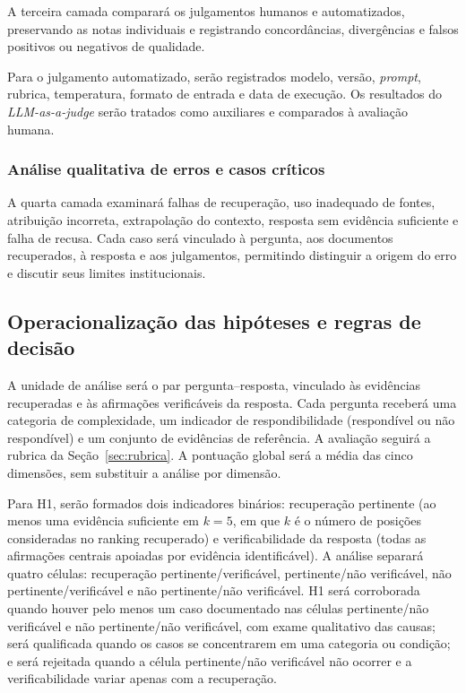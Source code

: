 A terceira camada comparará os julgamentos humanos e automatizados, preservando as notas individuais e registrando concordâncias, divergências e falsos positivos ou negativos de qualidade.

Para o julgamento automatizado, serão registrados modelo, versão, \textit{prompt}, rubrica, temperatura, formato de entrada e data de execução. Os resultados do \textit{LLM-as-a-judge} serão tratados como auxiliares e comparados à avaliação humana.

\subsubsection{Análise qualitativa de erros e casos críticos}

A quarta camada examinará falhas de recuperação, uso inadequado de fontes, atribuição incorreta, extrapolação do contexto, resposta sem evidência suficiente e falha de recusa. Cada caso será vinculado à pergunta, aos documentos recuperados, à resposta e aos julgamentos, permitindo distinguir a origem do erro e discutir seus limites institucionais.

\subsection{Operacionalização das hipóteses e regras de decisão}
\label{sec:hipoteses-operacionais}

A unidade de análise será o par pergunta--resposta, vinculado às evidências recuperadas e às afirmações verificáveis da resposta. Cada pergunta receberá uma categoria de complexidade, um indicador de respondibilidade (respondível ou não respondível) e um conjunto de evidências de referência. A avaliação seguirá a rubrica da Seção~\ref{sec:rubrica}. A pontuação global será a média das cinco dimensões, sem substituir a análise por dimensão.

Para H1, serão formados dois indicadores binários: recuperação pertinente (ao menos uma evidência suficiente em $k=5$, em que $k$ é o número de posições consideradas no ranking recuperado) e verificabilidade da resposta (todas as afirmações centrais apoiadas por evidência identificável). A análise separará quatro células: recuperação pertinente/verificável, pertinente/não verificável, não pertinente/verificável e não pertinente/não verificável. H1 será corroborada quando houver pelo menos um caso documentado nas células pertinente/não verificável e não pertinente/não verificável, com exame qualitativo das causas; será qualificada quando os casos se concentrarem em uma categoria ou condição; e será rejeitada quando a célula pertinente/não verificável não ocorrer e a verificabilidade variar apenas com a recuperação.

